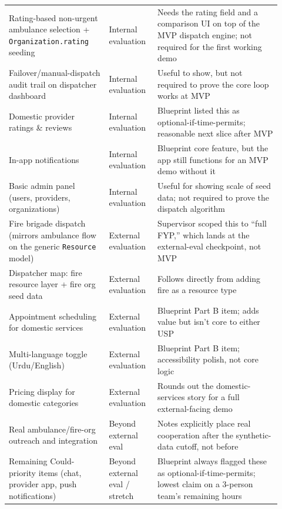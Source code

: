 \documentclass[11pt,a4paper]{article}
\begin{document}
\begin{longtable}{p{0.34\linewidth} p{0.16\linewidth} p{0.42\linewidth}}
\addlinespace
Rating-based non-urgent ambulance selection + \texttt{Organization.rating} seeding & Internal evaluation & Needs the rating field and a comparison UI on top of the MVP dispatch engine; not required for the first working demo \\
\addlinespace
Failover/manual-dispatch audit trail on dispatcher dashboard & Internal evaluation & Useful to show, but not required to prove the core loop works at MVP \\
\addlinespace
Domestic provider ratings \& reviews & Internal evaluation & Blueprint listed this as optional-if-time-permits; reasonable next slice after MVP \\
\addlinespace
In-app notifications & Internal evaluation & Blueprint core feature, but the app still functions for an MVP demo without it \\
\addlinespace
Basic admin panel (users, providers, organizations) & Internal evaluation & Useful for showing scale of seed data; not required to prove the dispatch algorithm \\
\addlinespace
Fire brigade dispatch (mirrors ambulance flow on the generic \texttt{Resource} model) & External evaluation & Supervisor scoped this to ``full FYP,'' which lands at the external-eval checkpoint, not MVP \\
\addlinespace
Dispatcher map: fire resource layer + fire org seed data & External evaluation & Follows directly from adding fire as a resource type \\
\addlinespace
Appointment scheduling for domestic services & External evaluation & Blueprint Part B item; adds value but isn't core to either USP \\
\addlinespace
Multi-language toggle (Urdu/English) & External evaluation & Blueprint Part B item; accessibility polish, not core logic \\
\addlinespace
Pricing display for domestic categories & External evaluation & Rounds out the domestic-services story for a full external-facing demo \\
\addlinespace
Real ambulance/fire-org outreach and integration & Beyond external eval & Notes explicitly place real cooperation after the synthetic-data cutoff, not before \\
\addlinespace
Remaining Could-priority items (chat, provider app, push notifications) & Beyond external eval / stretch & Blueprint always flagged these as optional-if-time-permits; lowest claim on a 3-person team's remaining hours \\
\bottomrule
\end{longtable}
\end{document}
